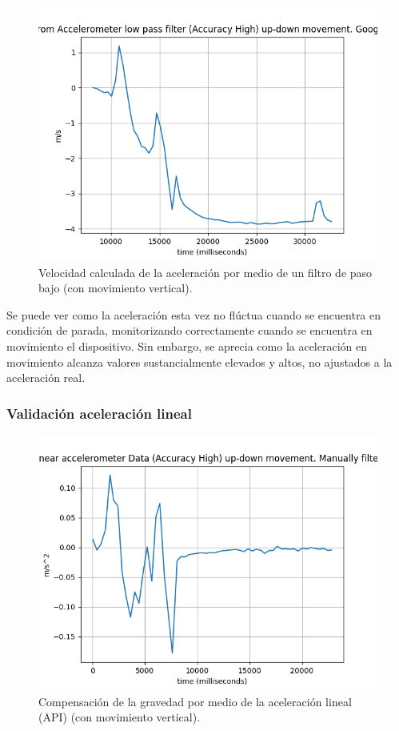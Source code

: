 \begin{figure}[H]
	\centering
	\includegraphics[scale=0.5]{imagenes/lowpassUpmovspeed.png}
	\caption{Velocidad calculada de la aceleración por medio de un filtro de paso bajo (con movimiento vertical).}
	\label{Velocidad vertical filtro paso bajo}
\end{figure}
\noindent
Se puede ver como la aceleración esta vez no flúctua cuando se encuentra en condición de parada, monitorizando correctamente cuando se encuentra en movimiento el dispositivo. Sin embargo, se aprecia como la aceleración en movimiento alcanza valores sustancialmente elevados y altos, no ajustados a la aceleración real.


\subsubsection{Validación aceleración lineal}

\begin{figure}[H]
	\centering
	\includegraphics[scale=0.5]{imagenes/linearGoogleup-down.png}
	\caption{Compensación de la gravedad por medio de la aceleración lineal (API) (con movimiento vertical).}
	\label{Movimiento vertical aceleracion lineal}
\end{figure}

